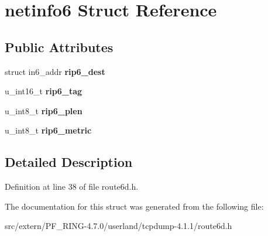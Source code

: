 \hypertarget{structnetinfo6}{
\section{netinfo6 Struct Reference}
\label{structnetinfo6}
}
\subsection*{Public Attributes}
\begin{DoxyCompactItemize}
\item 
\hypertarget{structnetinfo6_aad9c8deb5ea8c569240b81eb5b5b0096}{
struct in6\_\-addr {\bfseries rip6\_\-dest}}
\label{structnetinfo6_aad9c8deb5ea8c569240b81eb5b5b0096}

\item 
\hypertarget{structnetinfo6_a081a57f0dac7afa7fca4342e14560d01}{
u\_\-int16\_\-t {\bfseries rip6\_\-tag}}
\label{structnetinfo6_a081a57f0dac7afa7fca4342e14560d01}

\item 
\hypertarget{structnetinfo6_a86b3071b12be8f72397d634d52133ad9}{
u\_\-int8\_\-t {\bfseries rip6\_\-plen}}
\label{structnetinfo6_a86b3071b12be8f72397d634d52133ad9}

\item 
\hypertarget{structnetinfo6_ad4d41254aba3358e3f17f0cf4cc14df5}{
u\_\-int8\_\-t {\bfseries rip6\_\-metric}}
\label{structnetinfo6_ad4d41254aba3358e3f17f0cf4cc14df5}

\end{DoxyCompactItemize}


\subsection{Detailed Description}


Definition at line 38 of file route6d.h.



The documentation for this struct was generated from the following file:\begin{DoxyCompactItemize}
\item 
src/extern/PF\_\-RING-\/4.7.0/userland/tcpdump-\/4.1.1/route6d.h\end{DoxyCompactItemize}
